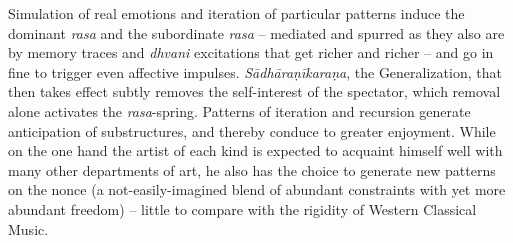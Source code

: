 Simulation of real emotions and iteration of particular patterns induce the dominant \textsl{rasa} and the subordinate \textsl{rasa} -- mediated and spurred as they also are by memory traces and \textsl{dhvani} excitations that get richer and richer -- and go in fine to trigger even affective impulses. \textsl{Sādhāraṇīkaraṇa}, the Generalization, that then takes effect subtly removes the self-interest of the spectator, which removal alone activates the \textsl{rasa}-spring. Patterns of iteration and recursion generate anticipation of substructures, and thereby conduce to greater enjoyment. While on the one hand the artist of each kind is expected to acquaint himself well with many other departments of art, he also has the choice to generate new patterns on the nonce (a not-easily-imagined blend of abundant constraints with yet more abundant freedom) -- little to compare with the rigidity of Western Classical Music.

